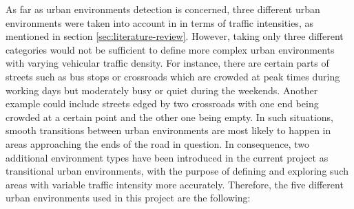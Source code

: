 \documentclass[bsc,frontabs,twoside,singlespacing, parskip,deptreport]{infthesis}     %
\begin{document}
As far as urban environments detection is concerned, three different urban environments were taken into account in \cite{rome2017} in terms of traffic intensities, as mentioned in section \ref{sec:literature-review}. However, taking only three different categories would not be sufficient to define more complex urban environments with varying vehicular traffic density. For instance, there are certain parts of streets such as bus stops or crossroads which are crowded at peak times during  working days but moderately busy or quiet during the weekends. Another example could include streets edged by two crossroads with one end being crowded at a certain point and the other one being empty. In such situations, smooth transitions between urban environments are most likely to happen in areas approaching the ends of the road in question. In consequence, two additional environment types have been introduced in the current project as transitional urban environments, with the purpose of defining and exploring such areas with variable traffic intensity more accurately. Therefore, the five different urban environments used in this project are the following:
\end{document}
